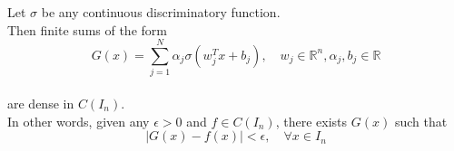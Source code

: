 \begin{algorithm}[h]
\centering
\caption{Cybenko's Theorem}
\begin{center}
    Let $\sigma$ be any continuous discriminatory function. \\
    Then finite sums of the form \\
    \begin{equation*}
        G(x) = \sum_{j=1}^N \alpha_j \sigma(w_j^T x + b_j), \quad w_j \in \mathbb{R}^n, \alpha_j, b_j \in \mathbb{R}
    \end{equation*} \\
    are dense in $C(I_n)$. \\
    In other words, given any $\epsilon > 0$ and $f \in C(I_n)$, there exists $G(x)$ such that \\
    \begin{equation*}
        |G(x) - f(x)| < \epsilon, \quad \forall x \in I_n
    \end{equation*}
\end{center}
\end{algorithm}
